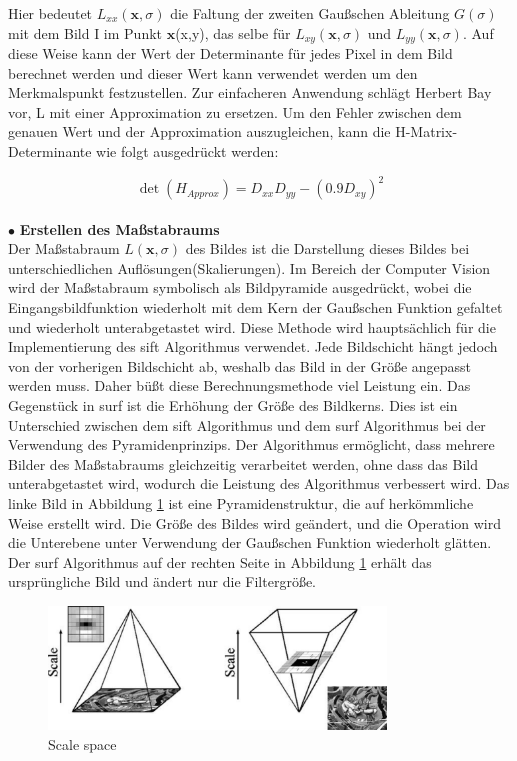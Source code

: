 Hier bedeutet $L_{xx}(\textbf{x},\sigma)$ die Faltung der zweiten Gaußschen Ableitung $G(\sigma)$ mit dem Bild I im Punkt $\textbf{x}$(x,y), das selbe für $L_{xy}(\textbf{x},\sigma)$ und $L_{yy}(\textbf{x},\sigma)$. Auf diese Weise kann der Wert der Determinante für jedes Pixel in dem Bild berechnet werden und dieser Wert kann verwendet werden um den Merkmalspunkt festzustellen.
Zur einfacheren Anwendung schlägt Herbert Bay \cite{Surf} vor, L mit einer Approximation zu ersetzen. Um den Fehler zwischen dem genauen Wert und der Approximation auszugleichen, kann die H-Matrix-Determinante wie folgt ausgedrückt werden:

\begin{equation}
   \det(H_{Approx}) = D_{xx}D_{yy} - (0.9D_{xy})^2  
\end{equation}
\\
$\bullet$ \textbf{Erstellen des Maßstabraums}\\
Der Maßstabraum $L(\textbf{x},\sigma)$ des Bildes ist die Darstellung dieses Bildes bei unterschiedlichen Auflösungen(Skalierungen). Im Bereich der Computer Vision wird der Maßstabraum symbolisch als Bildpyramide ausgedrückt, wobei die Eingangsbildfunktion wiederholt mit dem Kern der Gaußschen Funktion gefaltet und wiederholt unterabgetastet wird. Diese Methode wird hauptsächlich für die Implementierung des \gls{sift} Algorithmus verwendet. Jede Bildschicht hängt jedoch von der vorherigen Bildschicht ab, weshalb das Bild in der Größe angepasst werden muss. Daher büßt diese Berechnungsmethode viel Leistung ein. Das Gegenstück in \gls{surf} ist die Erhöhung der Größe des Bildkerns. Dies ist ein Unterschied zwischen dem \gls{sift} Algorithmus und dem \gls{surf} Algorithmus bei der Verwendung des Pyramidenprinzips.
Der Algorithmus ermöglicht, dass mehrere Bilder des Maßstabraums gleichzeitig verarbeitet werden, ohne dass das Bild unterabgetastet wird, wodurch die Leistung des Algorithmus verbessert wird. Das linke Bild in Abbildung \ref{fig:Scale space} ist eine Pyramidenstruktur, die auf herkömmliche Weise erstellt wird. Die Größe des Bildes wird geändert, und die Operation wird die Unterebene  unter Verwendung der Gaußschen Funktion wiederholt glätten. Der \gls{surf} Algorithmus auf der rechten Seite in Abbildung \ref{fig:Scale space} erhält das ursprüngliche Bild und ändert nur die Filtergröße.

\begin{figure}[htb]
 \centering 
 \includegraphics[keepaspectratio,width=0.8\textwidth]{images/3_Ersteverfahren/Scale_space.pdf}
 \caption{Scale space\cite{Surf}}
 \label{fig:Scale space}
\end{figure} 


